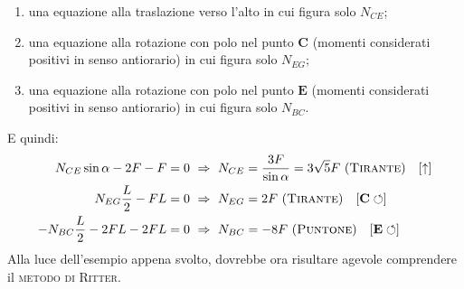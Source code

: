 \begin{enumerate}
\item una equazione alla traslazione verso l'alto in cui figura solo $N_{CE}$;
\item una equazione alla rotazione con polo nel punto $\mathbf{C}$ (momenti considerati positivi in senso antiorario) in cui figura solo $N_{EG}$;
\item una equazione alla rotazione con polo nel punto $\mathbf{E}$ (momenti considerati positivi in senso antiorario) in cui figura solo $N_{BC}$.
\end{enumerate}
E quindi:
\begin{align*}
N_{CE}\sin{\alpha}-2F-F &= 0 \,\,\Rightarrow\,\, N_{CE} = \frac{3F}{\sin{\alpha}} = 3\sqrt{5}F \,\, (\textup{\textsc{Tirante}}) \quad [\uparrow] \\
N_{EG}\frac{L}{2}-FL &= 0 \,\,\Rightarrow\,\, N_{EG} = 2F \,\, (\textup{\textsc{Tirante}}) \quad [\mathbf{C}\circlearrowleft] \\
-N_{BC}\frac{L}{2}-2FL-2FL &= 0 \,\,\Rightarrow\,\, N_{BC} = -8F \,\, (\textup{\textsc{Puntone}}) \quad [\mathbf{E}\circlearrowleft] 
\end{align*}
Alla luce dell'esempio appena svolto, dovrebbe ora risultare agevole comprendere il \textsc{metodo di Ritter}. 

